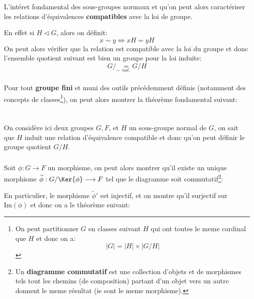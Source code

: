 \subsection*{}
L'intéret fondamental des sous-groupes normaux et qu'on peut alors caractériser les relations d'équivalences \textbf{compatibles} avec la loi de groupe.\<

En effet si \(H \lhd G\), alors on définit:
\[
   x \sim y \Longleftrightarrow xH = yH
\]
On peut alors vérifier que la relation est compatible avec la loi du groupe et donc l'ensemble quotient suivant est bien un groupe pour la loi induite:
\[
   G/_\sim \underset{not.}{=} G/H
\]
\subsection*{}
Pour tout \textbf{groupe fini} et muni des outils précédemment définis (notamment des concepts de classes\footnote[1]{On peut partitionner \(G\) en classes suivant \(H\) qui ont toutes le meme cardinal que \(H\) et donc on a:\[
   |G| = |H| \times |G/H|\]}), on peut alors montrer la théorème fondamental suivant:
\begin{center}
\end{center}
\chapter*{}
On considère ici deux groupes \(G, F\), et \(H\) un sous-groupe normal de \(G\), on sait que \(H\) induit une relation d'équivalence compatible et donc qu'on peut définir le groupe quotient \(G/H\).\<

\subsection*{}
Soit \(\phi : G \longrightarrow F\) un morphisme, on peut alors montrer qu'il existe un unique morphisme \(\widetilde{\phi} : G/\Ker{\phi} \longrightarrow F\) tel que le diagramme soit commutatif\footnote[1]{Un \textbf{diagramme commutatif} est une collection d'objets et de morphismes tels tout les chemins (de composition) partant d'un objet vers un autre donnent le meme résultat (ie sont le meme morphisme).}:
\begin{center}
\end{center}
En particulier, le morphisme \(\widetilde{\phi}'\) est injectif, et on montre qu'il surjectif sur \(\text{Im}(\phi)\) et donc on a le théorème suivant:
